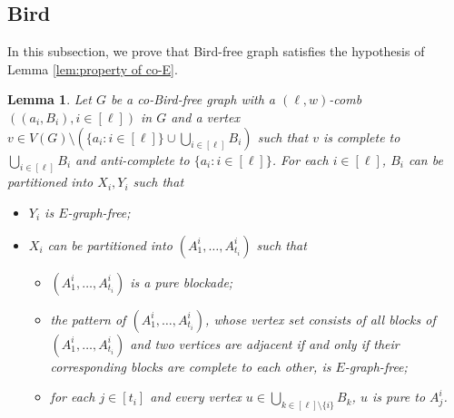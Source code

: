 \documentclass[a4paper,11pt]{article}
\newtheorem{lemma}[theorem]{Lemma}
\begin{document}
    
    
    \subsection{Bird}

    In this subsection, we prove that Bird-free graph satisfies the hypothesis of  Lemma \ref{lem:property of co-E}.

    \begin{lemma}\label{lem:coro-lem}
        Let $G$ be a co-Bird-free graph with a $(\ell,w)$-comb $((a_i,B_i),i\in[\ell])$ in $G$ and a vertex $v\in V(G)\setminus(\{a_i:i\in[\ell]\}\cup\bigcup_{i\in[\ell]}B_i)$ such that $v$ is complete to $\bigcup_{i\in[\ell]}B_i$ and anti-complete to $\{a_i:i\in[\ell]\}$. 
        For each $i\in[\ell]$, $B_i$ can be partitioned into $X_i,Y_i$ such that 
        \begin{itemize}
            \item[$(1)$] $Y_i$ is $E$-graph-free;  
            \item[$(2)$] $X_i$ can be partitioned into $(A^i_1,\ldots, A^i_{t_i})$ such that 
            \begin{itemize}
                \item[$(2.1)$] $(A^i_1,\ldots, A^i_{t_i})$ is a pure blockade; 
                \item[$(2.2)$] the pattern of $(A^i_1,\ldots, A^i_{t_i})$, whose vertex set consists of all blocks of $(A^i_1,\ldots, A^i_{t_i})$ and two vertices are adjacent if and only if their corresponding blocks are complete to each other, is $E$-graph-free; 
                \item[$(2.3)$] for each $j\in [t_i]$ and every vertex $u\in \bigcup_{k\in [\ell]\setminus \{i\}} B_k$, $u$ is pure to $A^i_j$.
            \end{itemize}
        \end{itemize} 
    \end{lemma}
\end{document}
